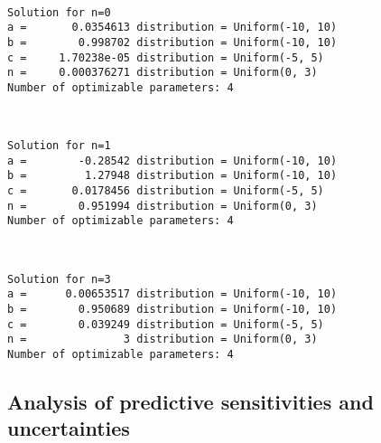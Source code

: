 \documentclass[11pt]{article}
\begin{document}
    \begin{center}
    \end{center}
    { \hspace*{\fill} \\}
    
    \begin{Verbatim}[commandchars=\\\{\}]
Solution for n=0
a =       0.0354613 distribution = Uniform(-10, 10)
b =        0.998702 distribution = Uniform(-10, 10)
c =     1.70238e-05 distribution = Uniform(-5, 5)
n =     0.000376271 distribution = Uniform(0, 3)
Number of optimizable parameters: 4
    \end{Verbatim}

    \begin{center}
    \end{center}
    { \hspace*{\fill} \\}
    
    \begin{Verbatim}[commandchars=\\\{\}]
Solution for n=1
a =        -0.28542 distribution = Uniform(-10, 10)
b =         1.27948 distribution = Uniform(-10, 10)
c =       0.0178456 distribution = Uniform(-5, 5)
n =        0.951994 distribution = Uniform(0, 3)
Number of optimizable parameters: 4
    \end{Verbatim}

    \begin{center}
    \end{center}
    { \hspace*{\fill} \\}
    
    \begin{Verbatim}[commandchars=\\\{\}]
Solution for n=3
a =      0.00653517 distribution = Uniform(-10, 10)
b =        0.950689 distribution = Uniform(-10, 10)
c =        0.039249 distribution = Uniform(-5, 5)
n =               3 distribution = Uniform(0, 3)
Number of optimizable parameters: 4
    \end{Verbatim}

    \hypertarget{analysis-of-predictive-sensitivities-and-uncertainties}{%
\subsection{Analysis of predictive sensitivities and
uncertainties}\label{analysis-of-predictive-sensitivities-and-uncertainties}}
\end{document}
